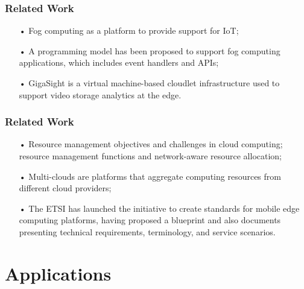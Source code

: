 \documentclass[10pt, pdf, xcolor=pdftex, dvipsnames, table]{beamer}
\begin{document}
\begin{frame}
	\tableofcontents[currentsection]
\end{frame}

\begin{frame}
	\frametitle{Related Work}
 	\begin{block}{}
 		\begin{itemize}
 		    \item[•] Fog computing as a platform to provide support  for IoT;\newline
 		    \item[•] A programming model has been proposed to support fog computing applications, which includes event handlers and APIs;\newline
 		    \item[•] GigaSight is a virtual machine-based cloudlet infrastructure used to support video storage analytics at the edge.
 		\end{itemize}
 	\end{block}
\end{frame}

\begin{frame}
	\frametitle{Related Work}
 	\begin{block}{}
 		\begin{itemize}
 		    \item[•] Resource management objectives and challenges in cloud computing; resource management functions and network-aware resource allocation;\newline
 		    \item[•] Multi-clouds are platforms that aggregate computing resources from different cloud providers;\newline
 		    \item[•] The ETSI has launched the initiative to create standards for mobile edge computing platforms, having proposed a blueprint and also documents presenting technical requirements, terminology, and service scenarios.
 		\end{itemize}
 	\end{block}
\end{frame}

\section[Applications]{Applications}

\begin{frame}
	\tableofcontents[currentsection]
\end{frame}
\end{document}
